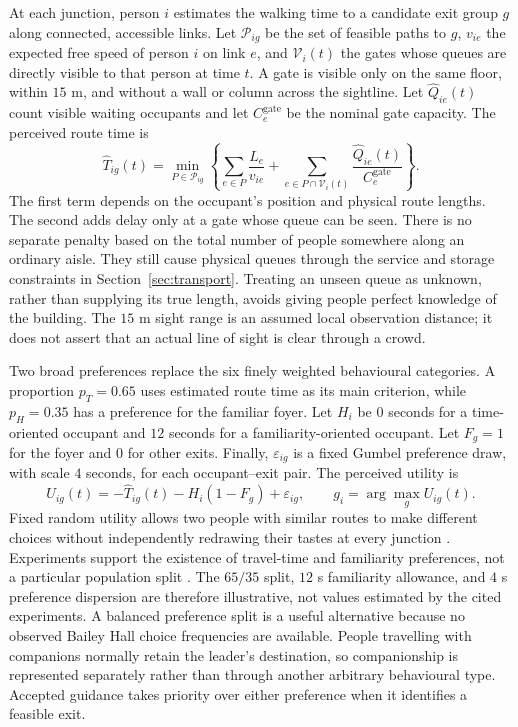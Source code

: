 \documentclass[11pt,a4paper]{article}
\begin{document}
At each junction, person $i$ estimates the walking time to a candidate exit group $g$ along connected, accessible links. Let $\mathcal P_{ig}$ be the set of feasible paths to $g$, $v_{ie}$ the expected free speed of person $i$ on link $e$, and $\mathcal V_i(t)$ the gates whose queues are directly visible to that person at time $t$. A gate is visible only on the same floor, within $15$ m, and without a wall or column across the sightline. Let $\widehat Q_{ie}(t)$ count visible waiting occupants and let $C_e^{\mathrm{gate}}$ be the nominal gate capacity. The perceived route time is
\begin{equation}\label{eq:perceived}
\widehat T_{ig}(t)=\min_{P\in\mathcal P_{ig}}
\left\{\sum_{e\in P}\frac{L_e}{v_{ie}}+
\sum_{e\in P\cap\mathcal V_i(t)}\frac{\widehat Q_{ie}(t)}{C_e^{\mathrm{gate}}}\right\}.
\end{equation}
The first term depends on the occupant's position and physical route lengths. The second adds delay only at a gate whose queue can be seen. There is no separate penalty based on the total number of people somewhere along an ordinary aisle. They still cause physical queues through the service and storage constraints in Section~\ref{sec:transport}. Treating an unseen queue as unknown, rather than supplying its true length, avoids giving people perfect knowledge of the building. The $15$ m sight range is an assumed local observation distance; it does not assert that an actual line of sight is clear through a crowd.

Two broad preferences replace the six finely weighted behavioural categories. A proportion $p_T=0.65$ uses estimated route time as its main criterion, while $p_H=0.35$ has a preference for the familiar foyer. Let $H_i$ be $0$ seconds for a time-oriented occupant and $12$ seconds for a familiarity-oriented occupant. Let $F_g=1$ for the foyer and $0$ for other exits. Finally, $\varepsilon_{ig}$ is a fixed Gumbel preference draw, with scale $4$ seconds, for each occupant--exit pair. The perceived utility is
\begin{equation}\label{eq:utility}
U_{ig}(t)=-\widehat T_{ig}(t)-H_i(1-F_g)+\varepsilon_{ig},
\qquad g_i=\arg\max_{g}U_{ig}(t).
\end{equation}
Fixed random utility allows two people with similar routes to make different choices without independently redrawing their tastes at every junction \cite{train}. Experiments support the existence of travel-time and familiarity preferences, not a particular population split \cite{liao,fu2024}. The $65/35$ split, $12$ s familiarity allowance, and $4$ s preference dispersion are therefore illustrative, not values estimated by the cited experiments. A balanced preference split is a useful alternative because no observed Bailey Hall choice frequencies are available. People travelling with companions normally retain the leader's destination, so companionship is represented separately rather than through another arbitrary behavioural type. Accepted guidance takes priority over either preference when it identifies a feasible exit.
\end{document}
